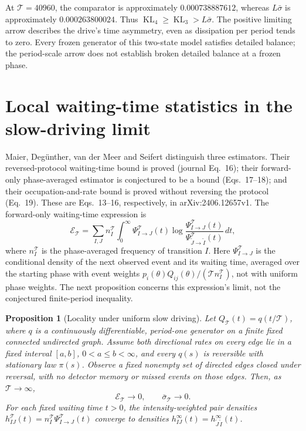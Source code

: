 \documentclass[10pt]{article}
\newtheorem{proposition}[theorem]{Proposition}
\theoremstyle{definition}
\DeclareMathOperator{\KL}{KL}
\newcommand{\per}{\mathcal T}
\begin{document}
At \(\per=40960\), the comparator is approximately
\(0.000738887612\), whereas \(L\bar\sigma\) is approximately
\(0.000263800024\). Thus \(\KL_4\geq\KL_3>L\bar\sigma\).
The positive limiting arrow describes the drive's time asymmetry,
even as dissipation per period tends to zero. Every frozen generator
of this two-state model satisfies detailed balance; the period-scale
arrow does not establish broken detailed balance at a frozen phase.

\section{Local waiting-time statistics in the slow-driving limit}
\label{sec:T3}

Maier, Deg\"unther, van der Meer and Seifert \cite{Maier2024} distinguish
three estimators. Their reversed-protocol waiting-time bound is proved
(journal Eq.~16); their forward-only phase-averaged estimator is
conjectured to be a bound (Eqs.~17--18); and their occupation-and-rate
bound is proved without reversing the protocol (Eq.~19).
These are Eqs.~13--16, respectively, in arXiv:2406.12657v1.
The forward-only waiting-time expression is
\[
\mathcal E_{\per}=\sum_{I,J} n_I^\per
\int_0^\infty \Psi^\per_{I\to J}(t)
\log\frac{\Psi^\per_{I\to J}(t)}
{\Psi^\per_{\widetilde J\to\widetilde I}(t)}\,dt,
\]
where \(n_I^\per\) is the phase-averaged frequency of transition \(I\).
Here \(\Psi^\per_{I\to J}\) is the conditional density of the next
observed event and its waiting time, averaged over the starting phase
with event weights \(p_i(\theta)Q_{ij}(\theta)/(\per n_I^\per)\),
not with uniform phase weights.
The next proposition concerns this expression's limit, not the
conjectured finite-period inequality.

\begin{proposition}[Locality under uniform slow driving]
\label{prop:T3}
Let \(Q_\per(t)=q(t/\per)\), where \(q\) is a continuously differentiable,
period-one generator on a finite fixed connected undirected graph.
Assume both directional rates on every edge lie in a fixed interval
\([a,b]\), \(0<a\leq b<\infty\), and every \(q(s)\) is reversible
with stationary law \(\pi(s)\). Observe a fixed nonempty set of directed
edges closed under reversal, with no detector memory or missed events on
those edges. Then, as \(\per\to\infty\),
\[
\mathcal E_{\per}\longrightarrow0,
\qquad
\bar\sigma_\per\longrightarrow0.
\]
For each fixed waiting time \(t>0\), the intensity-weighted pair densities
\(h^\per_{IJ}(t)=n_I^\per\Psi^\per_{I\to J}(t)\) converge to densities
\(h^\infty_{IJ}(t)=h^\infty_{\widetilde J\,\widetilde I}(t)\).
\end{proposition}
\end{document}
